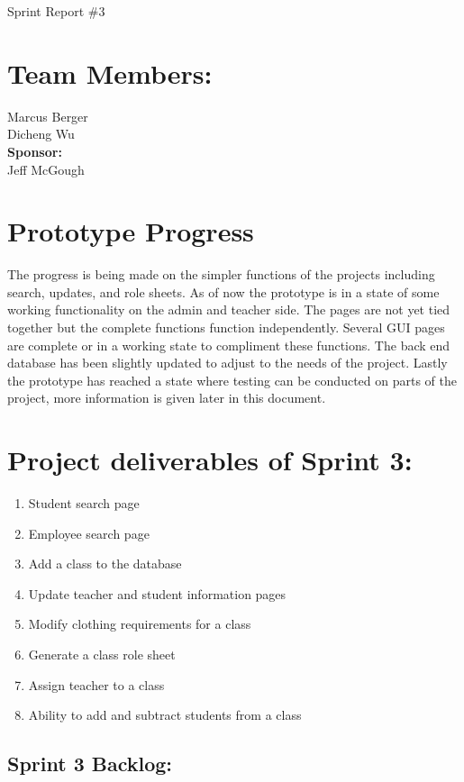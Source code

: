 \documentclass{book}
\begin{document}
\frontmatter\selectfont Sprint Report \#3


\section{Team Members:}
Marcus Berger
\\Dicheng Wu\\
\textbf{Sponsor:}
\\Jeff McGough
\\

\section{Prototype Progress}
The progress is being made on the simpler functions of the projects including search, updates, and role sheets. As of now the prototype is in a state of some working functionality on the admin and teacher side. The pages are not yet tied together but the complete functions function independently. Several GUI pages are complete or in a working state to compliment these functions. The back end database has been slightly updated to adjust to the needs of the project. Lastly the prototype has reached a state where testing can be conducted on parts of the project, more information is given later in this document.

\section{Project deliverables of Sprint 3:}

\begin{enumerate}
\item Student search page 
\item Employee search page
\item Add a class to the database
\item Update teacher and student information pages
\item Modify clothing requirements for a class
\item Generate a class role sheet
\item Assign teacher to a class
\item Ability to add and subtract students from a class  
\end{enumerate}


\subsection{Sprint 3 Backlog:}
\end{document}
